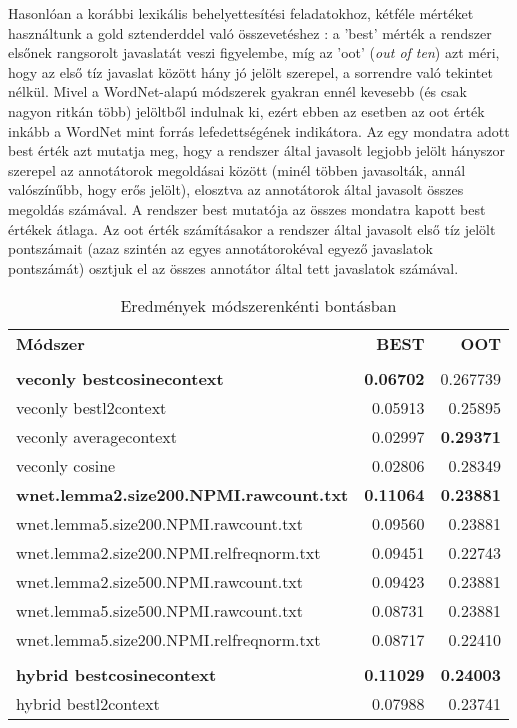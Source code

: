 \documentclass{llncs}
\begin{document}
Hasonl\'{o}an a kor\'{a}bbi lexik\'{a}lis behelyettes\'{i}t\'{e}si feladatokhoz, k\'{e}tf\'{e}le m\'{e}rt\'{e}ket haszn\'{a}ltunk a gold sztenderddel val\'{o} \"{o}sszevet\'{e}shez \cite{mccarthynavigli10} : a 'best' m\'{e}rt\'{e}k a rendszer els\H{o}nek rangsorolt javaslat\'{a}t veszi figyelembe, m\'{i}g az 'oot' (\emph{out of ten}) azt m\'{e}ri, hogy az els\H{o} t\'{i}z javaslat k\"{o}z\"{o}tt h\'{a}ny j\'{o} jel\"{o}lt szerepel, a sorrendre val\'{o} tekintet n\'{e}lk\"{u}l. Mivel a WordNet-alap\'{u} m\'{o}dszerek gyakran enn\'{e}l kevesebb (\'{e}s csak nagyon ritk\'{a}n t\"{o}bb) jel\"{o}ltb\H{o}l indulnak ki, ez\'{e}rt ebben az esetben az oot \'{e}rt\'{e}k ink\'{a}bb a WordNet mint forr\'{a}s lefedetts\'{e}g\'{e}nek indik\'{a}tora. Az egy mondatra adott best \'{e}rt\'{e}k azt mutatja meg, hogy a rendszer \'{a}ltal javasolt legjobb jel\"{o}lt h\'{a}nyszor szerepel az annot\'{a}torok megold\'{a}sai k\"{o}z\"{o}tt (min\'{e}l t\"{o}bben javasolt\'{a}k, ann\'{a}l val\'{o}sz\'{i}n\H{u}bb, hogy er\H{o}s jel\"{o}lt), elosztva az annot\'{a}torok \'{a}ltal javasolt \"{o}sszes megold\'{a}s sz\'{a}m\'{a}val. A rendszer best mutat\'{o}ja az \"{o}sszes mondatra kapott best \'{e}rt\'{e}kek \'{a}tlaga. Az oot \'{e}rt\'{e}k sz\'{a}m\'{i}t\'{a}sakor a rendszer \'{a}ltal javasolt els\H{o} t\'{i}z jel\"{o}lt pontsz\'{a}mait (azaz szint\'{e}n az egyes annot\'{a}torok\'{e}val egyez\H{o} javaslatok pontsz\'{a}m\'{a}t) osztjuk el az \"{o}sszes annot\'{a}tor \'{a}ltal tett javaslatok sz\'{a}m\'{a}val.\\

\begin{table}
\centering
\begin{tabular}{lrr}
{\bf M\'{o}dszer} & {\bf BEST} & {\bf OOT}\\               
\tabularnewline
\midrule
\bf{veconly bestcosinecontext } & \bf{0.06702} &  0.267739 \\
veconly bestl2context & 0.05913 &  0.25895 \\
veconly averagecontext & 0.02997 & \bf{0.29371} \\
veconly cosine & 0.02806 &  0.28349
\tabularnewline
\midrule
\bf{wnet.lemma2.size200.NPMI.rawcount.txt }  & \bf{0.11064}  & \bf{0.23881} \\
wnet.lemma5.size200.NPMI.rawcount.txt   & 0.09560 & 0.23881 \\
wnet.lemma2.size200.NPMI.relfreqnorm.txt  & 0.09451 & 0.22743 \\
wnet.lemma2.size500.NPMI.rawcount.txt    & 0.09423 & 0.23881 \\
wnet.lemma5.size500.NPMI.rawcount.txt    & 0.08731 & 0.23881 \\ 
wnet.lemma5.size200.NPMI.relfreqnorm.txt & 0.08717 & 0.22410 \\
\tabularnewline
\midrule
\bf{hybrid bestcosinecontext} & \bf{0.11029} & \bf{0.24003} \\
hybrid bestl2context & 0.07988 & 0.23741 \\
\bottomrule
\end{tabular}
\caption{Eredm\'{e}nyek m\'{o}dszerenk\'{e}nti bont\'{a}sban}
\end{table}
\end{document}
